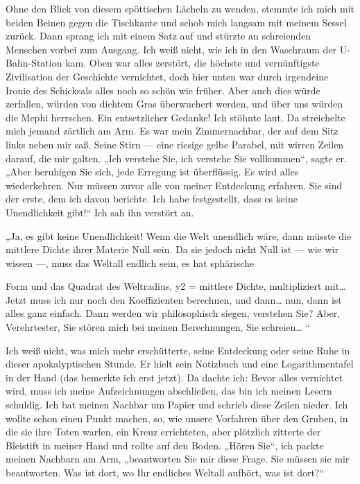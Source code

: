 Ohne den Blick von diesem spöttischen Lächeln zu wenden, stemmte
ich mich mit beiden Beinen gegen die Tischkante und schob mich
langsam mit meinem Sessel zurück. Dann sprang ich mit einem Satz
auf und stürzte an schreienden Menschen vorbei zum Ausgang. Ich
weiß nicht, wie ich in den Waschraum der U-Bahn-Station kam. Oben
war alles zerstört, die höchste und vernünftigste Zivilisation der
Geschichte vernichtet, doch hier unten war durch irgendeine Ironie
des Schicksals alles noch so schön wie früher. Aber auch dies würde
zerfallen, würden von dichtem Gras überwuchert werden, und über uns
würden die Mephi herrschen. Ein entsetzlicher Gedanke! Ich stöhnte
laut. Da streichelte mich jemand zärtlich am Arm. Es war mein
Zimmernachbar, der auf dem Sitz links neben mir saß. Seine Stirn —
eine riesige gelbe Parabel, mit wirren Zeilen darauf, die mir
galten. „Ich verstehe Sie, ich verstehe Sie vollkommen“, sagte er.
„Aber beruhigen Sie sich, jede Erregung ist überflüssig. Es wird
alles wiederkehren. Nur müssen zuvor alle von meiner Entdeckung
erfahren. Sie sind der erste, dem ich davon berichte. Ich habe
festgestellt, dass es keine Unendlichkeit gibt!“ Ich sah ihn
verstört an.

„Ja, es gibt keine Unendlichkeit! Wenn die Welt unendlich wäre,
dann müsste die mittlere Dichte ihrer Materie Null sein. Da sie
jedoch nicht Null ist — wie wir wissen —, muss das Weltall endlich
sein, es hat sphärische

Form und das Quadrat des Weltradius, y2 = mittlere Dichte,
multipliziert mit\ldots{} Jetzt muss ich nur noch den Koeffizienten
berechnen, und dann\ldots{} nun, dann ist alles ganz einfach. Dann
werden wir philosophisch siegen, verstehen Sie? Aber, Verehrtester,
Sie stören mich bei meinen Berechnungen, Sie schreien\ldots{} “

Ich weiß nicht, was mich mehr erschütterte, seine Entdeckung oder
seine Ruhe in dieser apokalyptischen Stunde. Er hielt sein
Notizbuch und eine Logarithmentafel in der Hand (das bemerkte ich
erst jetzt). Da dachte ich: Bevor alles vernichtet wird, muss ich
meine Aufzeichnungen abschließen, das bin ich meinen Lesern
schuldig. Ich bat meinen Nachbar um Papier und schrieb diese Zeilen
nieder. Ich wollte schon einen Punkt machen, so, wie unsere
Vorfahren über den Gruben, in die sie ihre Toten warfen, ein Kreuz
errichteten, aber plötzlich zitterte der Bleistift in meiner Hand
und rollte auf den Boden. „Hören Sie“, ich packte meinen Nachbarn
am Arm, „beantworten Sie mir diese Frage. Sie müssen sie mir
beantworten. Was ist dort, wo Ihr endliches Weltall aufhört, was
ist dort?“

